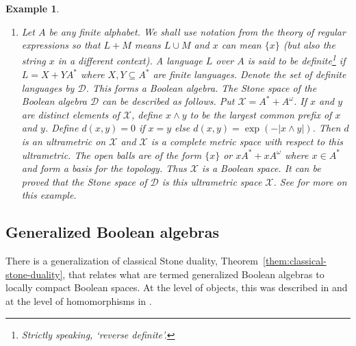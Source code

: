 \documentclass[a4paper]{amsart}
\newtheorem{example}[theorem]{Example}
\begin{document}
\begin{example}
{\begin{enumerate}
\item Let $A$ be any finite alphabet.
We shall use notation from the theory of regular expressions so that $L + M$ means $L \cup M$ and $x$ can mean $\{x \}$ (but also the string $x$ in a different context).
A language $L$ over $A$ is said to be {\em definite}\footnote{Strictly speaking, `reverse definite'.}
if $L = X + YA^{\ast}$ where $X,Y \subseteq A^{\ast}$ are finite languages. 
Denote the set of definite languages by $\mathscr{D}$.
This forms a Boolean algebra.
The Stone space of the Boolean algebra $\mathscr{D}$ can be described as follows.
Put $\mathscr{X} = A^{\ast} + A^{\omega}$.
If $x$ and $y$ are distinct elements of $\mathscr{X}$, 
define $x \wedge y$ to be the largest common prefix of $x$ and $y$.
Define $d(x,y) = 0$ if $x = y$ else $d(x,y) = \exp(-|x \wedge y|)$.
Then $d$ is an ultrametric on $\mathscr{X}$ and $\mathscr{X}$ is a complete metric space with respect to this ultrametric.
The open balls are of the form $\{x\}$ or $xA^{\ast} + xA^{\omega}$ where $x \in A^{\ast}$ and form a basis for the topology.
Thus $\mathscr{X}$ is a Boolean space.
It can be proved that the Stone space of $\mathscr{D}$ is this ultrametric space $\mathscr{X}$.
See \cite{Pin} for more on this example.

\end{enumerate}
}
\end{example}



\subsection{Generalized Boolean algebras}

There is a generalization of classical Stone duality,
Theorem~\ref{them:classical-stone-duality}, 
that relates what are termed generalized Boolean algebras to locally compact Boolean spaces.
At the level of objects, this was described in \cite[Theorem 4]{Stone1937} and at the level of homomorphisms in \cite{Doctor}.
\end{document}
